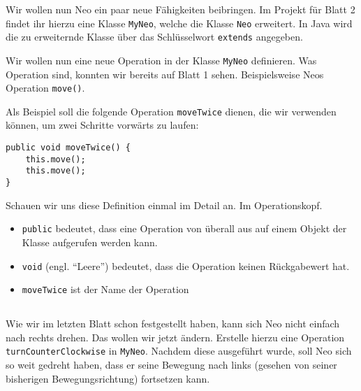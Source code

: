 \newcommand\ownclass{\lstinline|MyNeo|}
\newcommand\superclass{\lstinline|Neo|}

\begin{questions}


    \renewcommand{\workingtimeMinutes}{drölf}
    Wir wollen nun Neo ein paar neue Fähigkeiten beibringen.
    Im Projekt für Blatt 2 findet ihr hierzu eine Klasse \ownclass{},
    welche die Klasse \superclass{}  erweitert. In Java wird die zu erweiternde Klasse über das Schlüsselwort \lstinline{extends} angegeben.

    Wir wollen nun eine neue Operation in der Klasse \ownclass{} definieren. Was Operation sind, konnten wir bereits auf Blatt 1 sehen. Beispielsweise Neos Operation \lstinline{move()}.

    Als Beispiel soll die folgende Operation \texttt{moveTwice} dienen, die wir verwenden können, um zwei Schritte vorwärts zu laufen:
    \begin{lstlisting}
public void moveTwice() {
    this.move();
    this.move();
}
    \end{lstlisting}
    Schauen wir uns diese Definition einmal im Detail an. Im Operationskopf.
    \begin{itemize}
    \item \lstinline{public} bedeutet, dass eine Operation von überall aus auf einem Objekt der Klasse aufgerufen werden kann.
    \item \lstinline{void} (engl. ``Leere'') bedeutet, dass die Operation keinen Rückgabewert hat.
    \item \lstinline{moveTwice} ist der Name der Operation
    \end{itemize}

    \begin{parts}
    \part{}
    Wie wir im letzten Blatt schon festgestellt haben, kann sich Neo nicht einfach nach rechts drehen. Das wollen wir jetzt ändern.
    Erstelle hierzu eine Operation \lstinline{turnCounterClockwise} in \ownclass. Nachdem diese ausgeführt wurde, soll Neo sich so weit gedreht haben, dass er seine Bewegung nach links (gesehen von seiner bisherigen Bewegungsrichtung) fortsetzen kann.


\end{parts}
\end{questions}
